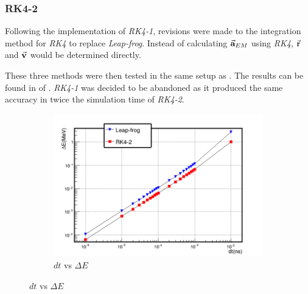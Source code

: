 \documentclass[a4paper,oneside,12pt]{report}
\numberwithin{equation}{chapter}
\begin{document}
\subsubsection{RK4-2}
Following the implementation of \textit{RK4-1}, revisions were made to the integration method for \textit{RK4} to replace \textit{Leap-frog}.
Instead of calculating $\vec{\textbf{a}}_{EM}$ using \textit{RK4}, $\vec{\textbf{r}}$ and $\vec{\textbf{v}}$ would be determined directly.

These three methods were then tested in the same setup as . The results can be found in  of .
\textit{RK4-1} was decided to be abandoned as it produced the same accuracy in twice the simulation time of \textit{RK4-2}.
\clearpage
\iffalse \begin{figure}
    \centering
    \begin{subfigure}{0.8\textwidth}
        \centering
        \includegraphics[width=\linewidth]{./figures/analiz/mag_lf_rk2_dt-E.png}
        \caption*{$dt$ vs $\Delta E$}
    \end{subfigure}
    

\end{figure}
\end{document}
